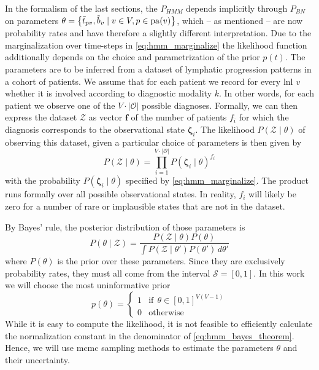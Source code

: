 \documentclass[../ms.tex]{subfiles}
\begin{document}
In the formalism of the last sections, the $P_{HMM}$ depends implicitly through $P_{BN}$ on parameters $\theta = \left\{ \Tilde{t}_{pv} , \Tilde{b}_v \mid v \in V , p \in \operatorname{pa}(v) \right\}$, which – as mentioned – are now probability rates and have therefore a slightly different interpretation. Due to the marginalization over time-steps in \cref{eq:hmm_marginalize} the likelihood function additionally depends on the choice and parametrization of the prior $p(t)$. The parameters are to be inferred from a dataset of lymphatic progression patterns in a cohort of patients. We assume that for each patient we record for every \gls{lnl} $v$ whether it is involved according to diagnostic modality $k$. In other words, for each patient we observe one of the $V \cdot |\mathcal{O}|$ possible diagnoses. Formally, we can then express the dataset $\boldsymbol{\mathcal{Z}}$ as vector $\mathbf{f}$ of the number of patients $f_i$ for which the diagnosis corresponds to the observational state $\boldsymbol{\zeta}_i$. The likelihood $P \left( \boldsymbol{\mathcal{Z}} \mid \theta \right)$ of observing this dataset, given a particular choice of parameters is then given by
%
\begin{equation}
    P \left( \boldsymbol{\mathcal{Z}} \mid \theta \right) = \prod_{i=1}^{V \cdot |\mathcal{O}|}{P \left( \boldsymbol{\zeta}_i \mid \theta \right)^{f_i}}
\end{equation}
%
with the probability $P \left( \boldsymbol{\zeta}_i \mid \theta \right)$ specified by \cref{eq:hmm_marginalize}. The product runs formally over all possible observational states. In reality, $f_i$ will likely be zero for a number of rare or implausible states that are not in the dataset.

By Bayes' rule, the posterior distribution of those parameters is 
%
\begin{equation} \label{eq:hmm_bayes_theorem}
    P \left( \theta \mid \boldsymbol{\mathcal{Z}} \right) = \frac{P \left( \boldsymbol{\mathcal{Z}} \mid \theta \right) P\left( \theta \right)}{\int{P \left( \boldsymbol{\mathcal{Z}} \mid \theta' \right) P \left( \theta' \right) \,d\theta'}}
\end{equation}
%
where $P(\theta)$ is the prior over these parameters. Since they are exclusively probability rates, they must all come from the interval $\mathcal{S} = [0,1]$. In this work we will choose the most uninformative prior
%
\begin{equation}
    p(\theta) = 
    \begin{cases}
        1 & \text{if} \ \ \theta \in \left[ 0,1 \right]^{V(V-1)} \\
        0 & \text{otherwise}
    \end{cases}
\end{equation}
%
While it is easy to compute the likelihood, it is not feasible to efficiently calculate the normalization constant in the denominator of \cref{eq:hmm_bayes_theorem}. Hence, we will use \gls{mcmc} sampling methods to estimate the parameters $\theta$ and their uncertainty.
\end{document}
